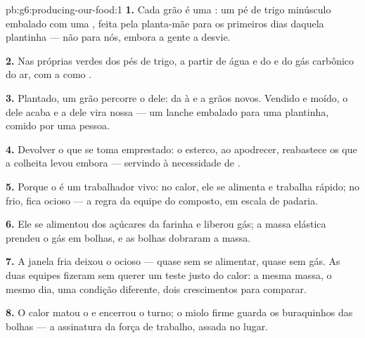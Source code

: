 \begin{solution}{pb:g6:producing-our-food:1}
\textbf{1.} Cada grão é uma : um pé de trigo minúsculo embalado
com uma , feita pela planta-mãe para os primeiros
dias daquela plantinha --- não para nós, embora a gente a desvie.

\textbf{2.} Nas próprias  verdes dos pés de trigo, a partir de
água e  do  e do gás carbônico do ar, com a  como
.

\textbf{3.} Plantado, um grão percorre o  dele: da
 à  e a grãos novos. Vendido e moído, o 
dele acaba e a  dele vira nossa --- um lanche
embalado para uma plantinha, comido por uma pessoa.

\textbf{4.} Devolver o que se toma emprestado: o esterco, ao
apodrecer, reabastece os  que a colheita levou embora ---
servindo à necessidade de .

\textbf{5.} Porque o  é um trabalhador vivo: no calor, ele se
alimenta e trabalha rápido; no frio, fica ocioso --- a regra da equipe
do composto, em escala de padaria.

\textbf{6.} Ele se alimentou dos açúcares da farinha e liberou gás; a
massa elástica prendeu o gás em bolhas, e as bolhas dobraram a massa.

\textbf{7.} A janela fria deixou o  ocioso --- quase sem se
alimentar, quase sem gás. As duas equipes fizeram sem querer um teste
justo do calor: a mesma massa, o mesmo dia, uma condição diferente,
dois crescimentos para comparar.

\textbf{8.} O calor matou o  e encerrou o turno; o miolo
firme guarda os buraquinhos das bolhas --- a assinatura da força de
trabalho, assada no lugar.


\end{solution}
